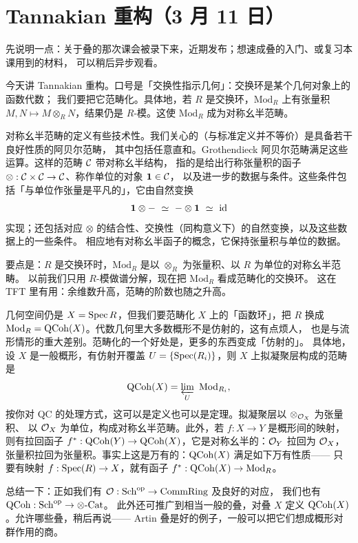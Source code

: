\section[Tannakian 重构]{Tannakian 重构（3 月 11 日）}

先说明一点：关于叠的那次课会被录下来，近期发布；想速成叠的入门、或复习本课用到的材料，
可以稍后异步观看。

今天讲 Tannakian 重构。口号是「交换性指示几何」：交换环是某个几何对象上的函数代数；
我们要把它范畴化。具体地，若 $R$ 是交换环，$\mathrm{Mod}_R$ 上有张量积
$M,N\mapsto M\otimes_R N$，结果仍是 $R$-模。这使 $\mathrm{Mod}_R$ 成为对称幺半范畴。

对称幺半范畴的定义有些技术性。我们关心的（与标准定义并不等价）是具备若干良好性质的阿贝尔范畴，
其中包括任意直和。Grothendieck 阿贝尔范畴满足这些运算。这样的范畴 $\mathcal{C}$ 带对称幺半结构，
指的是给出行称张量积的函子 $\otimes:\mathcal{C}\times\mathcal{C}\to\mathcal{C}$、称作单位的对象 $\mathbf{1}\in\mathcal{C}$，
以及进一步的数据与条件。这些条件包括「与单位作张量是平凡的」，它由自然变换
\[
\mathbf{1}\otimes -\ \simeq\ -\otimes\mathbf{1}\ \simeq\ \id
\]
实现；还包括对应 $\otimes$ 的结合性、交换性（同构意义下）的自然变换，以及这些数据上的一些条件。
相应地有对称幺半函子的概念，它保持张量积与单位的数据。

要点是：$R$ 是交换环时，$\mathrm{Mod}_R$ 是以 $\otimes_R$ 为张量积、以 $R$ 为单位的对称幺半范畴。
以前我们只用 $R$-模做谱分解，现在把 $\mathrm{Mod}_R$ 看成范畴化的交换环。
这在 TFT 里有用：余维数升高，范畴的阶数也随之升高。

几何空间仍是 $X=\operatorname{Spec} R$，但我们要范畴化 $X$ 上的「函数环」，把 $R$ 换成
$\mathrm{Mod}_R=\mathrm{QCoh}(X)$。代数几何里大多数概形不是仿射的，这有点烦人，
也是与流形情形的重大差别。范畴化的一个好处是，更多的东西变成「仿射的」。
具体地，设 $X$ 是一般概形，有仿射开覆盖 $U=\{\operatorname{Spec}(R_i)\}$，则 $X$ 上拟凝聚层构成的范畴是
\[
\QCoh(X)=\varprojlim_{U}\ \mathrm{Mod}_{R_i},
\]
按你对 QC 的处理方式，这可以是定义也可以是定理。拟凝聚层以 $\otimes_{\mathcal{O}_X}$ 为张量积、
以 $\mathcal{O}_X$ 为单位，构成对称幺半范畴。此外，若 $f:X\to Y$ 是概形间的映射，
则有拉回函子 $f^*:\mathrm{QCoh}(Y)\to\mathrm{QCoh}(X)$，它是对称幺半的：$\mathcal{O}_Y$ 拉回为 $\mathcal{O}_X$，
张量积拉回为张量积。事实上这是万有的：$\mathrm{QCoh}(X)$ 满足如下万有性质——
只要有映射 $f:\operatorname{Spec}(R)\to X$，就有函子 $f^*:\mathrm{QCoh}(X)\to\mathrm{Mod}_R$。

总结一下：正如我们有 $\mathcal{O}:\mathrm{Sch}^{\mathrm{op}}\to\mathrm{CommRing}$ 及良好的对应，
我们也有 $\mathrm{QCoh}:\mathrm{Sch}^{\mathrm{op}}\to\otimes\text{-}\mathrm{Cat}$。
此外还可推广到相当一般的叠，对叠 $X$ 定义 $\mathrm{QCoh}(X)$。允许哪些叠，稍后再说——
Artin 叠是好的例子，一般可以把它们想成概形对群作用的商。

